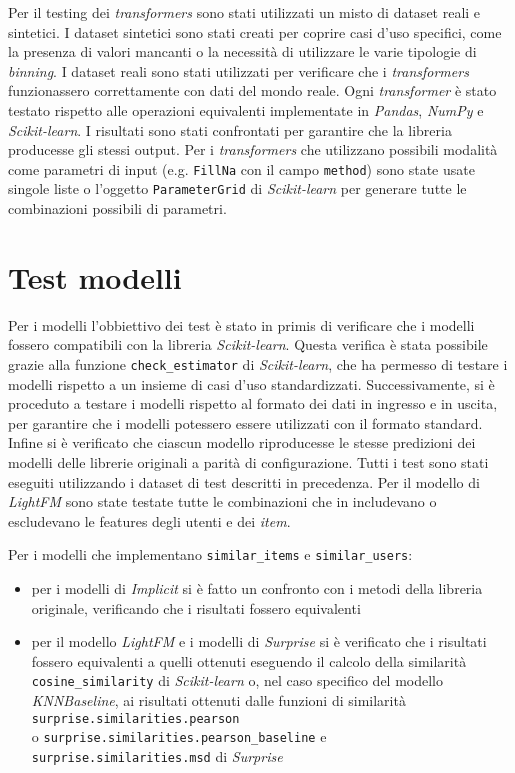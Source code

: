 Per il testing dei \textit{transformers} sono stati utilizzati un misto di dataset reali e sintetici. I dataset sintetici sono stati creati per coprire casi d'uso specifici, come la presenza di valori mancanti o la necessità di utilizzare le varie tipologie di \textit{binning}. I dataset reali sono stati utilizzati per verificare che i \textit{transformers} funzionassero correttamente con dati del mondo reale. Ogni \textit{transformer} è stato testato rispetto alle operazioni equivalenti implementate in \textit{Pandas}, \textit{NumPy} e \textit{Scikit-learn}. I risultati sono stati confrontati per garantire che la libreria producesse gli stessi output. Per i \textit{transformers} che utilizzano possibili modalità come parametri di input (e.g. \texttt{FillNa} con il campo \texttt{method}) sono state usate singole liste o l'oggetto \texttt{ParameterGrid} di \textit{Scikit-learn} per generare tutte le combinazioni possibili di parametri.

\section{Test modelli}

Per i modelli l'obbiettivo dei test è stato in primis di verificare che i modelli fossero compatibili con la libreria \textit{Scikit-learn}. Questa verifica è stata possibile grazie alla funzione \texttt{check\_estimator} di \textit{Scikit-learn}, che ha permesso di testare i modelli rispetto a un insieme di casi d'uso standardizzati. Successivamente, si è proceduto a testare i modelli rispetto al formato dei dati in ingresso e in uscita, per garantire che i modelli potessero essere utilizzati con il formato standard. Infine si è verificato che ciascun modello riproducesse le stesse predizioni dei modelli delle librerie originali a parità di configurazione. Tutti i test sono stati eseguiti utilizzando i dataset di test descritti in precedenza. Per il modello di \textit{LightFM} sono state testate tutte le combinazioni che in includevano o escludevano le features degli utenti e dei \textit{item}.

Per i modelli che implementano \texttt{similar\_items} e \texttt{similar\_users}:

\begin{itemize}
    \item per i modelli di \textit{Implicit} si è fatto un confronto con i metodi della libreria originale, verificando che i risultati fossero equivalenti
    \item per il modello \textit{LightFM} e i modelli di \textit{Surprise} si è verificato che i risultati fossero equivalenti a quelli ottenuti eseguendo il calcolo della similarità \texttt{cosine\_similarity} di \textit{Scikit-learn} o, nel caso specifico del modello \textit{KNNBaseline}, ai risultati ottenuti dalle funzioni di similarità \\ \texttt{surprise.similarities.pearson} \\ o  \texttt{surprise.similarities.pearson\_baseline} e \\ \texttt{surprise.similarities.msd} di \textit{Surprise}
\end{itemize}

